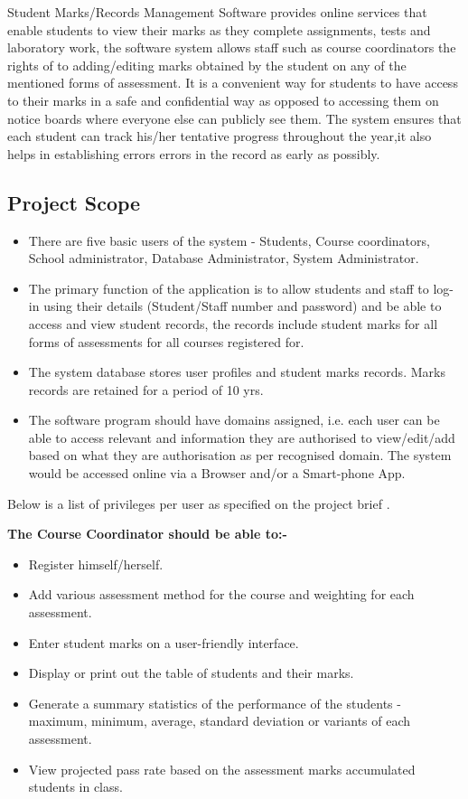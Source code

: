 \documentclass[10pt,onecolumn]{lab}
\begin{document}
Student Marks/Records Management Software provides online services that enable students to view their marks as they complete  assignments, tests and laboratory work, the software system allows staff such as course coordinators the rights of to adding/editing marks obtained by the student on any of the mentioned forms of assessment. It is a convenient way for students to have access to their marks in a safe and confidential way as opposed to accessing them on notice boards where everyone else can publicly see them. The system ensures that each student can track his/her tentative progress throughout the year,it also helps in establishing errors errors in the record as early as possibly. 

\subsection{Project Scope}
\begin{itemize}

\item There are five basic users of the system - Students, Course coordinators, School administrator, Database Administrator, System Administrator.
\item The primary function of the application is to allow students and staff  to log-in using their details (Student/Staff number and password) and be able to access and view student records, the records include student marks for all forms of assessments for all courses registered for. 
\item The system database stores user profiles and student marks records. Marks records are retained for a period of 10 yrs.
\item The software program should have domains assigned, i.e. each user can be able to access relevant and information they are authorised to view/edit/add based on what they are authorisation as per recognised  domain.  The system would be accessed online via a Browser and/or a Smart-phone App.

\end{itemize}

Below is a list of privileges per user as specified on the project brief \cite{ref9}.

\textbf{The Course Coordinator should be able to:-}
\begin{itemize}
\item Register himself/herself.
\item Add various assessment method for the course and weighting for each assessment.
\item Enter student marks on a user-friendly interface.
\item Display or print out the table of students and their marks.
\item Generate a summary statistics of the performance of the students - maximum, minimum, average, standard deviation or variants of each assessment.  
\item View projected pass rate based on the assessment marks accumulated students in class.
\end{itemize}
\end{document}
